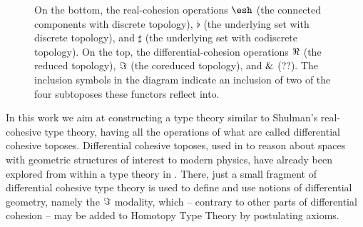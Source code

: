 \documentclass{article}
\begin{document}
\begin{figure}
\begin{center}
\end{center}
\caption{On the bottom, the real-cohesion operations $\shape$ (the connected
  components with discrete topology), $\flat$ (the underlying set with discrete topology), and $\sharp$ (the underlying set with
  codiscrete topology). On the top, the differential-cohesion operations $\Re$
  (the reduced topology), $\Im$ (the coreduced topology), and $\&$ (??).
   The inclusion symbols in the diagram indicate an
  inclusion of two of the four subtoposes these functors reflect into. }
\label{fig:modalities}
\end{figure}

In this work we aim at constructing a type theory similar to Shulman's real-cohesive type theory,
having all the operations of what are called differential cohesive toposes.
Differential cohesive toposes, used in \citet{Schreiber2013} 
to reason about spaces with geometric structures of interest to modern physics,
have already been explored from within a type theory in \citeauthor{Wellen2017}.
There, just a small fragment of differential cohesive type theory is used to define and 
use notions of differential geometry, namely the $\Im$ modality, which -- contrary to other parts of differential cohesion -- 
may be added to Homotopy Type Theory by postulating axioms. 
\end{document}
